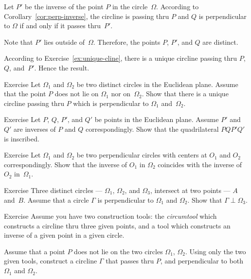 Let $P'$ be the inverse of the point $P$ in the circle~$\Omega$.
According to Corollary~\ref{cor:perp-inverse},
the circline is passing thru $P$ and $Q$ 
is perpendicular to $\Omega$ if and only if it passes thru~$P'$.

Note that $P'$ lies outside of~$\Omega$.
Therefore, the points $P$, $P'$, and $Q$ are distinct.

According to Exercise~\ref{ex:unique-cline},
there is a unique circline passing thru $P$, $Q$, and~$P'$.
Hence the result.
\qeds

\begin{thm}{Exercise}\label{ex:cline-perp-to-two}
Let $\Omega_1$ and $\Omega_2$ be two distinct circles in the Euclidean plane.
Assume that the point $P$ does not lie on $\Omega_1$ nor on~$\Omega_2$.
Show that there is a unique circline passing thru $P$ which is perpendicular to $\Omega_1$ and~$\Omega_2$.
\end{thm}

\begin{thm}{Exercise}\label{ex:inscribed+inv}
Let $P$, $Q$, $P'$, and $Q'$ be points in the Euclidean plane.
Assume $P'$ and $Q'$ are inverses of $P$ and $Q$ correspondingly.
Show that the quadrilateral $PQP'Q'$ is inscribed.
\end{thm}

\begin{thm}{Exercise}\label{ex:centers-of-perp-circles}
Let $\Omega_1$ and $\Omega_2$ be two perpendicular circles with centers at $O_1$ and $O_2$ correspondingly.
Show that the inverse of $O_1$ in $\Omega_2$ 
coincides with 
the inverse of $O_2$ in~$\Omega_1$.
\end{thm}

\begin{thm}{Exercise}\label{ex:4-th-perp-circ}
Three distinct circles --- $\Omega_1$, $\Omega_2$, and $\Omega_3$, intersect at two points --- $A$ and~$B$.
Assume that a circle $\Gamma$ is perpendicular to $\Omega_1$ and $\Omega_2$.
Show that $\Gamma\perp\Omega_3$.
\end{thm}

\begin{thm}{Exercise}\label{ex:construction-perp-clines}
Assume you have two construction tools:
the \emph{circumtool} which constructs a circline thru three given points, 
and a tool which constructs an inverse of a given point in a given circle.

Assume that a point $P$ does not lie on the two circles $\Omega_1$, $\Omega_2$.
Using only the two given tools,
construct a circline $\Gamma$ that passes thru $P$, 
and perpendicular to both $\Omega_1$ and $\Omega_2$.
\end{thm}

